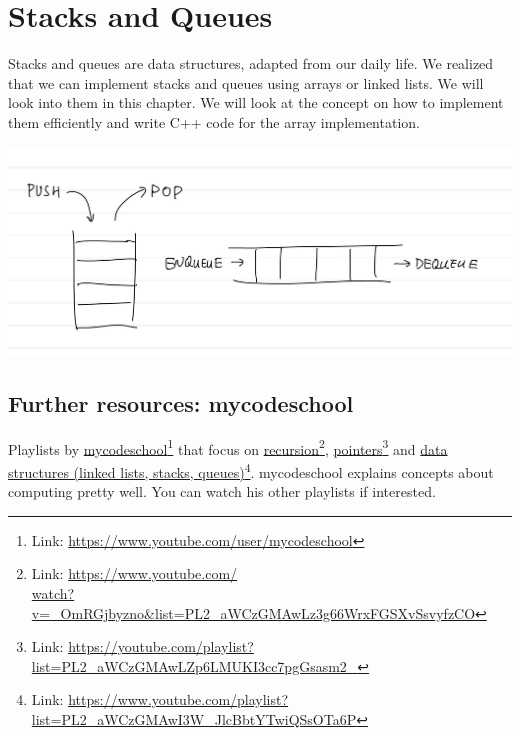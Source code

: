 \chapter{Stacks and Queues}

Stacks and queues are data structures, adapted from our daily life. We realized that we can implement stacks and queues using arrays or linked lists. We will look into them in this chapter. We will look at the concept on how to implement them efficiently and write C++ code for the array implementation.

\includegraphics[width=15cm]{images/ch6-stackqueue.png}

\section{Further resources: mycodeschool}

Playlists by 
\href{https://www.youtube.com/user/mycodeschool}{mycodeschool}\footnote{Link: \href{https://www.youtube.com/user/mycodeschool}{https://www.youtube.com/user/mycodeschool}}
that focus on 
\href{https://www.youtube.com/watch?v=_OmRGjbyzno&list=PL2_aWCzGMAwLz3g66WrxFGSXvSsvyfzCO}{recursion}\footnote{Link: \href{https://www.youtube.com/watch?v=_OmRGjbyzno&list=PL2_aWCzGMAwLz3g66WrxFGSXvSsvyfzCO}{https://www.youtube.com/\\watch?v=\_OmRGjbyzno\&list=PL2\_aWCzGMAwLz3g66WrxFGSXvSsvyfzCO}}, 
\href{https://youtube.com/playlist?list=PL2_aWCzGMAwLZp6LMUKI3cc7pgGsasm2_}{pointers}\footnote{Link: \href{https://youtube.com/playlist?list=PL2_aWCzGMAwLZp6LMUKI3cc7pgGsasm2_}{https://youtube.com/playlist?list=PL2\_aWCzGMAwLZp6LMUKI3cc7pgGsasm2\_}} and 
\href{https://www.youtube.com/playlist?list=PL2_aWCzGMAwI3W_JlcBbtYTwiQSsOTa6P}{data structures (linked lists, stacks, queues)}\footnote{Link: \href{https://www.youtube.com/playlist?list=PL2_aWCzGMAwI3W_JlcBbtYTwiQSsOTa6P}{https://www.youtube.com/playlist?list=PL2\_aWCzGMAwI3W\_JlcBbtYTwiQSsOTa6P}}.
mycodeschool explains concepts about computing pretty well. You can watch his other playlists if interested.

